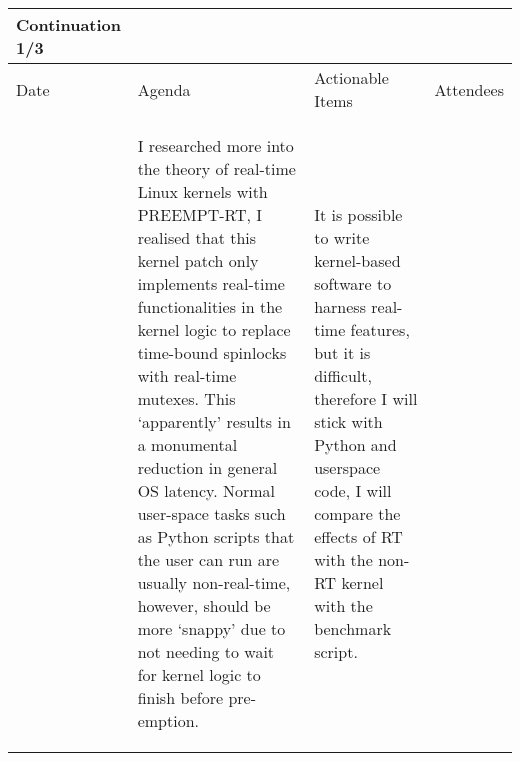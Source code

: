 \begin{table}[!h]
    \centering
    \begin{tabularx}{\textwidth}{|l|X|X|X|}
        \hline
        Continuation 1/3 \\
        \hline
        \hline
        Date & Agenda & Actionable Items & Attendees \\
        \hline
        \hline
        & 
        \begin{myitemize}
            \item I researched more into the theory of real-time Linux kernels with PREEMPT-RT, I realised that this kernel patch only implements real-time functionalities in the kernel logic to replace time-bound spinlocks with real-time mutexes. This `apparently' results in a monumental reduction in general OS latency. Normal user-space tasks such as Python scripts that the user can run are usually non-real-time, however, should be more `snappy' due to not needing to wait for kernel logic to finish before pre-emption.
        \end{myitemize} & 
        \begin{myitemize}
            \item It is possible to write kernel-based software to harness real-time features, but it is difficult, therefore I will stick with Python and userspace code, I will compare the effects of RT with the non-RT kernel with the benchmark script.
        \end{myitemize} &
        \\
        \hline
    \end{tabularx}
\end{table}

\pagebreak

